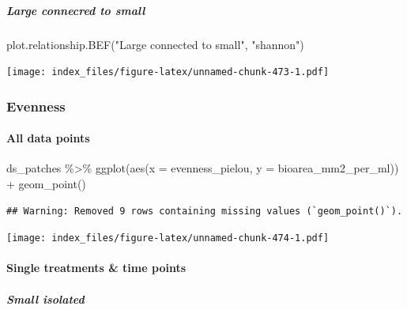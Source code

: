 \documentclass[
]{article}
\newenvironment{Shaded}{\begin{snugshade}}{\end{snugshade}}
\newcommand{\AttributeTok}[1]{\textcolor[rgb]{0.77,0.63,0.00}{#1}}
\newcommand{\FunctionTok}[1]{\textcolor[rgb]{0.00,0.00,0.00}{#1}}
\newcommand{\NormalTok}[1]{#1}
\newcommand{\SpecialCharTok}[1]{\textcolor[rgb]{0.00,0.00,0.00}{#1}}
\newcommand{\StringTok}[1]{\textcolor[rgb]{0.31,0.60,0.02}{#1}}
\begin{document}
\hypertarget{large-connecred-to-small-1}{%
\subparagraph{Large connecred to
small}\label{large-connecred-to-small-1}}

\begin{Shaded}
\begin{Highlighting}[]
\FunctionTok{plot.relationship.BEF}\NormalTok{(}\StringTok{"Large connected to small"}\NormalTok{,}
                      \StringTok{"shannon"}\NormalTok{)}
\end{Highlighting}
\end{Shaded}

\texttt{[image: index\_files/figure-latex/unnamed-chunk-473-1.pdf]}

\hypertarget{evenness-4}{%
\subsubsection{Evenness}\label{evenness-4}}

\hypertarget{all-data-points-3}{%
\paragraph{All data points}\label{all-data-points-3}}

\begin{Shaded}
\begin{Highlighting}[]
\NormalTok{ds\_patches }\SpecialCharTok{\%\textgreater{}\%}
  \FunctionTok{ggplot}\NormalTok{(}\FunctionTok{aes}\NormalTok{(}\AttributeTok{x =}\NormalTok{ evenness\_pielou,}
             \AttributeTok{y =}\NormalTok{ bioarea\_mm2\_per\_ml)) }\SpecialCharTok{+}
  \FunctionTok{geom\_point}\NormalTok{()}
\end{Highlighting}
\end{Shaded}

\begin{verbatim}
## Warning: Removed 9 rows containing missing values (`geom_point()`).
\end{verbatim}

\texttt{[image: index\_files/figure-latex/unnamed-chunk-474-1.pdf]}

\hypertarget{single-treatments-time-points-2}{%
\paragraph{Single treatments \& time
points}\label{single-treatments-time-points-2}}

\hypertarget{small-isolated-2}{%
\subparagraph{Small isolated}\label{small-isolated-2}}
\end{document}
